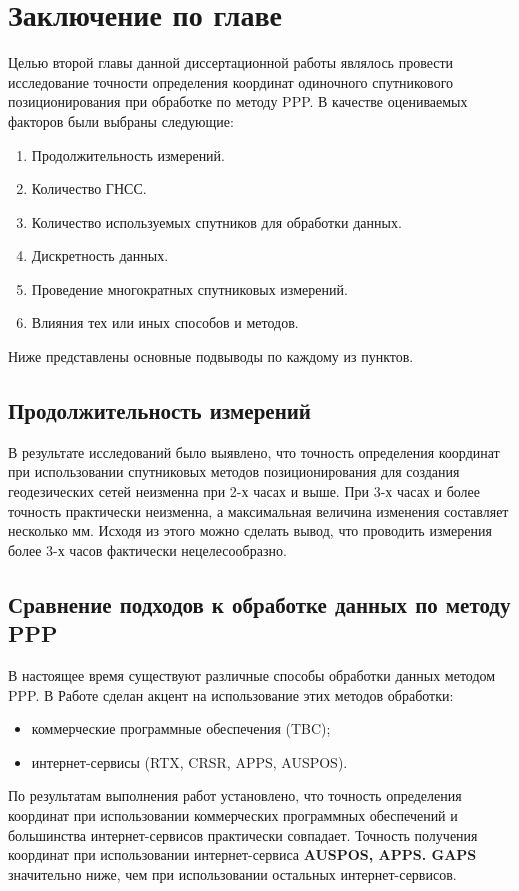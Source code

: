 \section{Заключение по главе}\label{sec:ch2/sect4}

Целью второй главы данной диссертационной работы являлось провести исследование точности определения координат одиночного спутникового позиционирования при обработке по методу PPP. В качестве оцениваемых факторов были выбраны следующие:
\begin{enumerate}
	\item Продолжительность измерений.
	\item Количество ГНСС.
	\item Количество используемых спутников для обработки данных.
	\item Дискретность данных.
	\item Проведение многократных спутниковых измерений.
	\item Влияния тех или иных способов и методов.
\end{enumerate}
Ниже представлены основные подвыводы по каждому из пунктов.

\subsection*{Продолжительность измерений}\label{subsec:ch2/sec4/sub-1}

В результате исследований было выявлено, что точность определения координат при использовании спутниковых методов позиционирования для создания геодезических сетей неизменна при 2-х часах и выше. При 3-х часах и более точность практически неизменна, а максимальная величина изменения составляет несколько мм. Исходя из этого можно сделать вывод, что проводить измерения более 3-х часов фактически нецелесообразно.

\subsection*{Сравнение подходов к обработке данных по методу PPP}\label{subsec:ch2/sec4/sub-2}

В настоящее время существуют различные способы обработки данных методом PPP. В Работе сделан акцент на использование этих методов обработки:
\begin{itemize}
	\item коммерческие программные обеспечения (TBC);
	\item интернет-сервисы (RTX, CRSR, APPS, AUSPOS).
\end{itemize}
По результатам выполнения работ установлено, что точность определения координат при использовании коммерческих программных обеспечений и большинства интернет-сервисов практически совпадает. Точность получения координат при использовании интернет-сервиса \textbf{AUSPOS, APPS. GAPS} значительно ниже, чем при использовании остальных интернет-сервисов.

